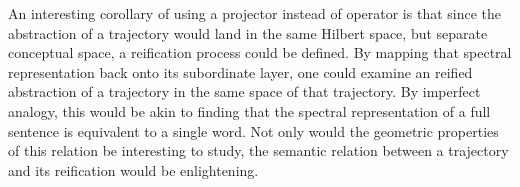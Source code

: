 An interesting corollary of using a projector instead of operator is that since the abstraction of a trajectory would land in the same Hilbert space, but separate conceptual space, a reification process could be defined.  By mapping that spectral representation back onto its subordinate layer, one could examine an reified abstraction of a trajectory in the same space of that trajectory.  By imperfect analogy, this would be akin to finding that the spectral representation of a full sentence is equivalent to a single word.  Not only would the geometric properties of this relation be interesting to study, the semantic relation between a trajectory and its reification would be enlightening.


